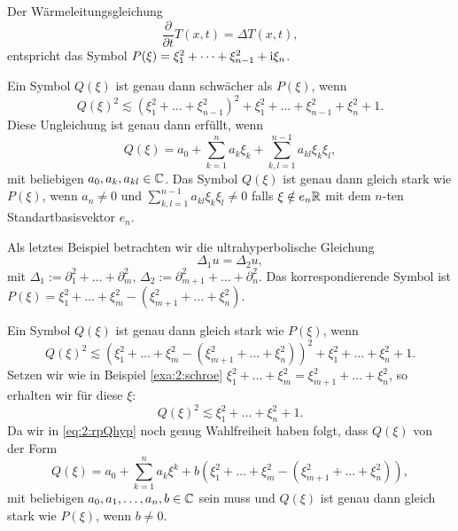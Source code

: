 \begin{exa}\label{exa:2:heat}
Der Wärmeleitungsgleichung
\begin{equation}
\frac{\partial}{\partial t}T(x,t)=\Delta T(x,t),
\end{equation}
entspricht das Symbol $P(\xi)=\xi^2_1+\dots+\xi^2_{n-1}+\mathrm i\xi_n$.

Ein Symbol $Q(\xi)$ ist genau dann schwächer als $P(\xi)$, wenn
\begin{equation}
Q(\xi)^2\apprle(\xi^2_1+\dots+\xi^2_{n-1})^2+\xi^2_1+\dots+\xi^2_{n-1}+\xi^2_n+1.
\end{equation}
Diese Ungleichung ist genau dann erfüllt, wenn
\begin{equation}
Q(\xi)=a_0+\sum_{k=1}^na_k\xi_k+\sum_{k,l=1}^{n-1}a_{kl}\xi_k\xi_l,
\end{equation}
mit beliebigen $a_0,a_k,a_{kl}\in\mathbb C$.
Das Symbol $Q(\xi)$ ist genau dann gleich stark wie $P(\xi)$,
wenn $a_n\neq0$ und $\sum_{k,l=1}^{n-1}a_{kl}\xi_k\xi_l\neq0$ falls $\xi\notin e_n\mathbb R$
mit dem $n$-ten Standartbasisvektor $e_n$.
\end{exa}

\begin{exa}\label{exa:2:hyper}
Als letztes Beispiel betrachten wir die ultrahyperbolische Gleichung
\begin{equation}
\Delta_1u=\Delta_2u,
\end{equation}
mit $\Delta_1:=\partial_1^2+\dots+\partial_m^2$, $\Delta_2:=\partial^2_{m+1}+\dots+\partial^2_n$.
Das korrespondierende Symbol ist $P(\xi)=\xi^2_1+\dots+\xi^2_m-(\xi^2_{m+1}+\dots+\xi^2_n)$.

Ein Symbol $Q(\xi)$ ist genau dann gleich stark wie $P(\xi)$,
wenn
\begin{equation}
Q(\xi)^2\apprle(\xi^2_1+\dots+\xi^2_m-(\xi^2_{m+1}+\dots+\xi^2_n))^2+\xi^2_1+\dots+\xi^2_n+1.
\end{equation}
Setzen wir wie in Beispiel \ref{exa:2:schroe} $\xi^2_1+\dots+\xi^2_m=\xi^2_{m+1}+\dots+\xi^2_n$,
so erhalten wir für diese $\xi$:
\begin{equation}\label{eq:2:rpQhyp}
Q(\xi)^2\apprle\xi^2_1+\dots+\xi^2_n+1.
\end{equation}
Da wir in \eqref{eq:2:rpQhyp} noch genug Wahlfreiheit haben folgt,
dass $Q(\xi)$ von der Form
\begin{equation}
Q(\xi)=a_0+\sum_{k=1}^na_k\xi^k+b(\xi_1^2+\dots+\xi^2_m-(\xi^2_{m+1}+\dots+\xi^2_n)),
\end{equation}
mit beliebigen $a_0,a_1,\dots,a_n,b\in\mathbb C$ sein muss
und $Q(\xi)$ ist genau dann gleich stark wie $P(\xi)$,
wenn $b\neq0$.
\end{exa}

